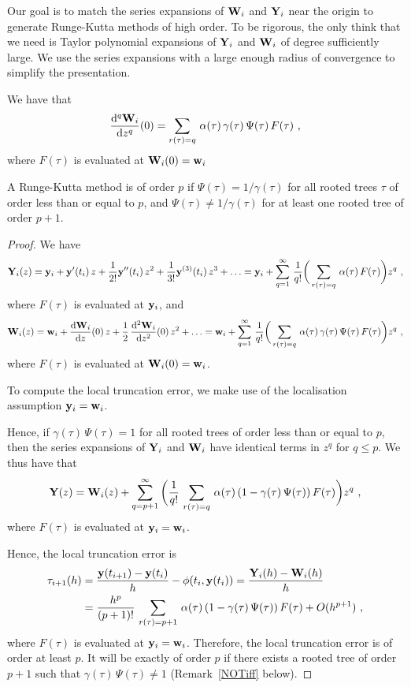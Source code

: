 Our goal is to match the series expansions of $\mathbf{W}_i$ and
$\mathbf{Y}_i$ near the origin to generate Runge-Kutta methods of high
order.   To be rigorous, the only think that we need is Taylor
polynomial expansions of $\mathbf{Y}_i$ and $\mathbf{W}_i$ of degree
sufficiently large.  We use the series expansions with a large enough
radius of convergence to simplify the presentation.

\begin{prop}
We have that
\[
\frac{\mathrm{d}^{q}{\mathbf{W}_i}}{\mathrm{d}{z}^{q}}(0) =
\sum_{r(\tau)=q}\,\alpha(\tau)\,\gamma(\tau)\,\Psi(\tau)\,F(\tau)
\ ,
\]
where $F(\tau)$ is evaluated at $\mathbf{W}_i(0) = \mathbf{w}_i$
\end{prop}

\begin{theorem}
A Runge-Kutta method is of order $p$ if $\Psi(\tau) = 1/\gamma(\tau)$
for all rooted trees $\tau$ of order less than or equal to $p$, and
$\Psi(\tau) \not= 1/\gamma(\tau)$ for at least one rooted tree of order
$p+1$.
\label{OrdRel}
\end{theorem}

\begin{proof}
We have
\[
\mathbf{Y}_i(z) = \mathbf{y}_i + \mathbf{y}'(t_i) \,z +
\frac{1}{2!}\mathbf{y}''(t_i) \, z^2 +
\frac{1}{3!}\mathbf{y}^{(3)}(t_i) \, z^3 + \ldots 
= \mathbf{y}_i + \sum_{q=1}^\infty\,\frac{1}{q!}\bigg(
\sum_{r(\tau)=q}\,\alpha(\tau)\,F(\tau) \bigg) z^q \ ,
\]
where $F(\tau)$ is evaluated at $\mathbf{y}_i$,
and
\[
\mathbf{W}_i(z) = \mathbf{w}_i + \frac{\mathrm{d}\mathbf{W}_i}{\mathrm{d}{z}}(0) \,z +
\frac{1}{2}\,\frac{\mathrm{d}^{2}{\mathbf{W}_i}}{\mathrm{d}{z}^{2}}(0) \,z^2 + \ldots
= \mathbf{w}_i + \sum_{q=1}^\infty\,\frac{1}{q!}\bigg(
\sum_{r(\tau)=q}\,\alpha(\tau)\,\gamma(\tau)\,\Psi(\tau)\,F(\tau)
\bigg) z^q  \ ,
\]
where $F(\tau)$ is evaluated at $\mathbf{W}_i(0) = \mathbf{w}_i$.

To compute the local truncation error, we make use of the localisation
assumption $\mathbf{y}_i = \mathbf{w}_i$.

Hence, if $\gamma(\tau)\,\Psi(\tau) = 1$ for all rooted trees of order
less than or equal to $p$, then the series expansions of $\mathbf{Y}_i$
and $\mathbf{W}_i$ have identical terms in $z^q$ for $q\leq p$.  We thus
have that
\[
\mathbf{Y}(z) = \mathbf{W}_i(z) + \sum_{q=p+1}^\infty\bigg(
\frac{1}{q!}\,\sum_{r(\tau)=q}\,\alpha(\tau) \left( 1
-\gamma(\tau)\,\Psi(\tau) \right)F(\tau)\bigg) z^q \ ,
\]
where $F(\tau)$ is evaluated at $\mathbf{y}_i = \mathbf{w}_i$.

Hence, the local truncation error is
\begin{equation}\label{TreeTruncErr}
\begin{split}
\tau_{i+1}(h) &=
\frac{\mathbf{y}(t_{i+1}) - \mathbf{y}(t_i)}{h} - \phi(t_i,\mathbf{y}(t_i))
= \frac{\mathbf{Y}_i(h) - \mathbf{W}_i(h)}{h} \\
& = \frac{h^p}{(p+1)!}\,\sum_{r(\tau)=p+1}\,\alpha(\tau) \left( 1
-\gamma(\tau)\,\Psi(\tau) \right)F(\tau) + O(h^{p+1}) \ ,
\end{split}
\end{equation}
where $F(\tau)$ is evaluated at $\mathbf{y}_i = \mathbf{w}_i$.
Therefore, the local truncation error is of order at least $p$.  It
will be exactly of order $p$ if there exists a rooted tree of order
$p+1$ such that $\gamma(\tau)\,\Psi(\tau) \not= 1$
(Remark~\ref{NOTiff} below).
\end{proof}

